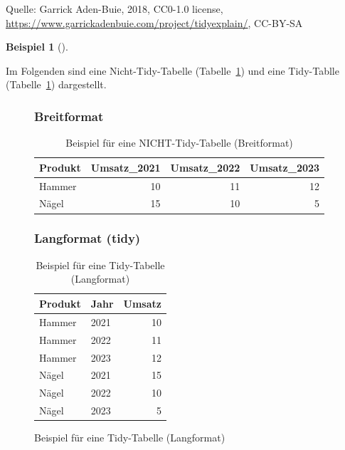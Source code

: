 \documentclass[
  a4paper,
  DIV=11]{scrreprt}
\theoremstyle{definition}
\theoremstyle{definition}
\newtheorem{example}{Beispiel}[chapter]
\theoremstyle{definition}
\theoremstyle{remark}
\begin{document}
{Quelle: Garrick Aden-Buie, 2018, CC0-1.0 license,
\url{https://www.garrickadenbuie.com/project/tidyexplain/}, CC-BY-SA}

\begin{example}[]\protect\hypertarget{exm-widelong}{}\label{exm-widelong}

Im Folgenden sind eine Nicht-Tidy-Tabelle (Tabelle~\ref{tbl-untidy1})
und eine Tidy-Tablle (Tabelle~\ref{tbl-tidy1}) dargestellt.

\begin{figure}

\begin{minipage}{0.50\linewidth}

\subsubsection{Breitformat}\label{breitformat}

\begin{longtable}[]{@{}lrrr@{}}

\caption{\label{tbl-untidy1}Beispiel für eine NICHT-Tidy-Tabelle
(Breitformat)}

\tabularnewline

\toprule\noalign{}
Produkt & Umsatz\_2021 & Umsatz\_2022 & Umsatz\_2023 \\
\midrule\noalign{}
\endhead
\bottomrule\noalign{}
\endlastfoot
Hammer & 10 & 11 & 12 \\
Nägel & 15 & 10 & 5 \\

\end{longtable}

\end{minipage}%
%
\begin{minipage}{0.50\linewidth}

\subsubsection{Langformat (tidy)}\label{langformat-tidy}

\begin{longtable}[]{@{}llr@{}}

\caption{\label{tbl-tidy1}Beispiel für eine Tidy-Tabelle (Langformat)}

\tabularnewline

\toprule\noalign{}
Produkt & Jahr & Umsatz \\
\midrule\noalign{}
\endhead
\bottomrule\noalign{}
\endlastfoot
Hammer & 2021 & 10 \\
Hammer & 2022 & 11 \\
Hammer & 2023 & 12 \\
Nägel & 2021 & 15 \\
Nägel & 2022 & 10 \\
Nägel & 2023 & 5 \\

\end{longtable}

\end{minipage}%

\end{figure}%

\end{example}
\end{document}
